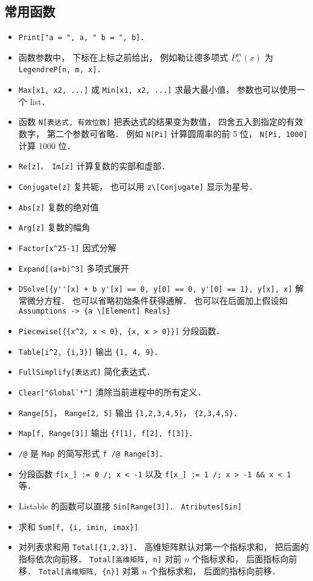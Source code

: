 \subsection{常用函数}
\begin{itemize}
\item \verb|Print["a = ", a, " b = ", b]|．
\item 函数参数中， 下标在上标之前给出， 例如勒让德多项式 $P_n^m(x)$ 为 \verb|LegendreP[n, m, x]|．
\item \verb|Max[x1, x2, ...]| 或 \verb|Min[x1, x2, ...]| 求最大最小值， 参数也可以使用一个 list．
\item 函数 \verb|N[表达式, 有效位数]| 把表达式的结果变为数值， 四舍五入到指定的有效数字， 第二个参数可省略． 例如 \verb|N[Pi]| 计算圆周率的前 5 位， \verb|N[Pi, 1000]| 计算 1000 位．
\item \verb|Re[z]， Im[z]| 计算复数的实部和虚部．
\item \verb|Conjugate[z]| 复共轭， 也可以用 \verb|z\[Conjugate]| 显示为星号．
\item \verb|Abs[z]| 复数的绝对值
\item \verb|Arg[z]| 复数的幅角
\item \verb|Factor[x^25-1]| 因式分解
\item \verb|Expand[(a+b)^3]| 多项式展开
\item \verb|DSolve[{y''[x] + b y'[x] == 0, y[0] == 0, y'[0] == 1}, y[x], x]| 解常微分方程． 也可以省略初始条件获得通解． 也可以在后面加上假设如 \verb|Assumptions -> {a \[Element] Reals}|
\item \verb|Piecewise[{{x^2, x < 0}, {x, x > 0}}]| 分段函数．
\item \verb|Table[i^2, {i,3}]| 输出 \verb|{1, 4, 9}|．
\item \verb|FullSimplify[表达式]| 简化表达式．
\item \verb|Clear["Global`*"]| 清除当前进程中的所有定义．
\item \verb|Range[5]|， \verb|Range[2, 5]| 输出 \verb|{1,2,3,4,5}|， \verb|{2,3,4,5}|．
\item \verb|Map[f, Range[3]]| 输出 \verb|{f[1], f[2], f[3]}|．
\item \verb|/@| 是 \verb|Map| 的简写形式 \verb|f /@ Range[3]|．
\item 分段函数 \verb|f[x_] := 0 /; x < -1| 以及 \verb|f[x_] := 1 /; x > -1 && x < 1| 等．
\item Listable 的函数可以直接 \verb|Sin[Range[3]]|． \verb|Atributes[Sin]|
\item 求和 \verb|Sum[f, {i, imin, imax}]|
\item 对列表求和用 \verb|Total[{1,2,3}]|． 高维矩阵默认对第一个指标求和， 把后面的指标依次向前移． \verb|Total[高维矩阵, n]| 对前 $n$ 个指标求和， 后面指标向前移． \verb|Total[高维矩阵, {n}]| 对第 $n$ 个指标求和， 后面的指标向前移．
\end{itemize}

